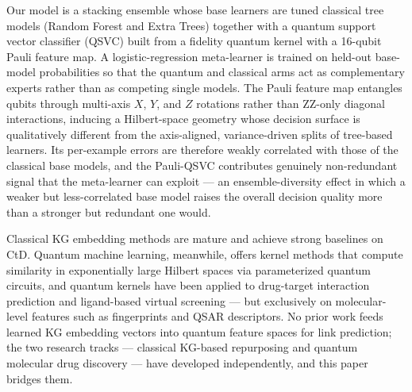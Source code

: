\documentclass[twocolumn,10pt]{article}
\begin{document}
Our model is a stacking ensemble whose base learners are tuned classical tree models (Random Forest and Extra Trees) together with a quantum support vector classifier (QSVC) built from a fidelity quantum kernel with a 16-qubit Pauli feature map. A logistic-regression meta-learner is trained on held-out base-model probabilities so that the quantum and classical arms act as complementary experts rather than as competing single models. The Pauli feature map entangles qubits through multi-axis $X$, $Y$, and $Z$ rotations rather than ZZ-only diagonal interactions, inducing a Hilbert-space geometry whose decision surface is qualitatively different from the axis-aligned, variance-driven splits of tree-based learners. Its per-example errors are therefore weakly correlated with those of the classical base models, and the Pauli-QSVC contributes genuinely non-redundant signal that the meta-learner can exploit --- an ensemble-diversity effect in which a weaker but less-correlated base model raises the overall decision quality more than a stronger but redundant one would.

Classical KG embedding methods are mature \cite{mayers2023} and achieve strong baselines on CtD. Quantum machine learning, meanwhile, offers kernel methods that compute similarity in exponentially large Hilbert spaces via parameterized quantum circuits, and quantum kernels have been applied to drug-target interaction prediction \cite{qkdti2025} and ligand-based virtual screening \cite{kruger2023} --- but exclusively on molecular-level features such as fingerprints and QSAR descriptors. No prior work feeds learned KG embedding vectors into quantum feature spaces for link prediction; the two research tracks --- classical KG-based repurposing and quantum molecular drug discovery --- have developed independently, and this paper bridges them.
\end{document}
